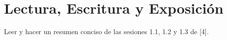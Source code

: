 \section{Lectura, Escritura y Exposición}
Leer y hacer un resumen conciso de las sesiones 1.1, 1.2 y 1.3 de [4].